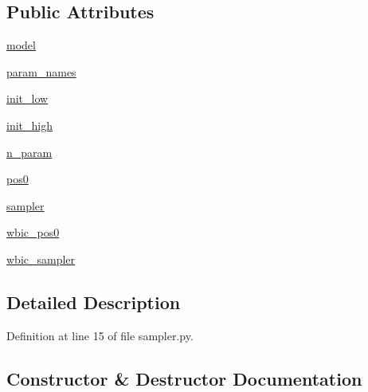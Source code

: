 \subsection*{Public Attributes}
\begin{DoxyCompactItemize}
\item 
\hyperlink{classsampler_1_1Sampler_a5582a0d537f1aa6f2c4eca9cb7e00859}{model}
\item 
\hyperlink{classsampler_1_1Sampler_a63de348f6e0cd91f24e09e66bfe160d4}{param\+\_\+names}
\item 
\hyperlink{classsampler_1_1Sampler_a8d5d2c3f85eace580c0633b79de6a3f2}{init\+\_\+low}
\item 
\hyperlink{classsampler_1_1Sampler_a6f7037a873847e97098dc065a329d0a3}{init\+\_\+high}
\item 
\hyperlink{classsampler_1_1Sampler_a10de0613d5ee970646098a8cf9a15fbe}{n\+\_\+param}
\item 
\hyperlink{classsampler_1_1Sampler_ad81b8f4bc5bc8925873719991006acd8}{pos0}
\item 
\hyperlink{classsampler_1_1Sampler_a29acc101d68c463f924d34f1f259708e}{sampler}
\item 
\hyperlink{classsampler_1_1Sampler_acc468d79c6593e5b1c282d938a9877f0}{wbic\+\_\+pos0}
\item 
\hyperlink{classsampler_1_1Sampler_a8476d0b5a5f4f22edef248b2f0930c6a}{wbic\+\_\+sampler}
\end{DoxyCompactItemize}


\subsection{Detailed Description}


Definition at line 15 of file sampler.\+py.



\subsection{Constructor \& Destructor Documentation}
\mbox{\label{classsampler_1_1Sampler_a0ebbb93e5c948bc426658cbdc92bfd12}} 
